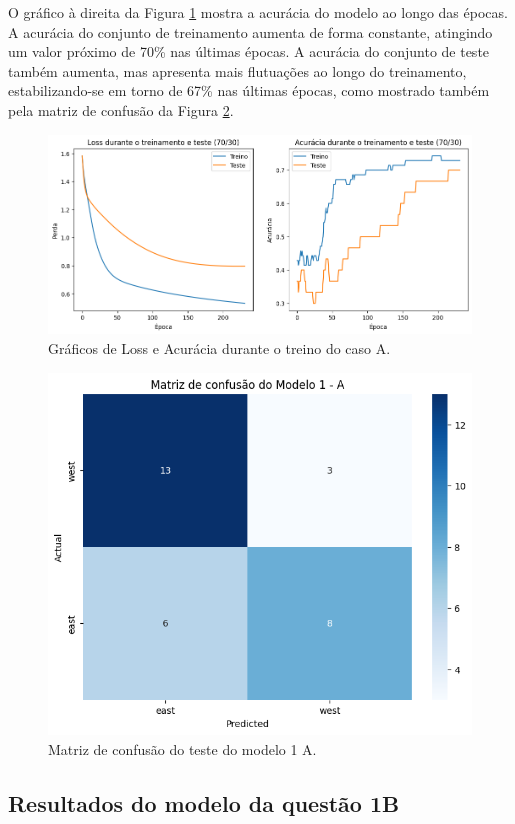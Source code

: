 \documentclass[12pt]{article}
\begin{document}
O gráfico à direita da Figura \ref{fig:model1ACMGraphs} mostra a acurácia do modelo ao longo das épocas. A acurácia do conjunto de treinamento aumenta de forma constante, atingindo um valor próximo de 70\% nas últimas épocas. A acurácia do conjunto de teste também aumenta, mas apresenta mais flutuações ao longo do treinamento, estabilizando-se em torno de 67\% nas últimas épocas, como mostrado também pela matriz de confusão da Figura \ref{fig:model1ACM}.

\begin{figure}[h]
    \centering
    \includegraphics[width=1\linewidth]{casoA1.jpg}
    \caption{Gráficos de Loss e Acurácia durante o treino do caso A.}
    \label{fig:model1ACMGraphs}
\end{figure}

\begin{figure}[h]
    \centering
    \includegraphics[width=0.7\linewidth]{cm1A.png}
    \caption{Matriz de confusão do teste do modelo 1 A.}
    \label{fig:model1ACM}
\end{figure}

\subsection{Resultados do modelo da questão 1B}
\end{document}
